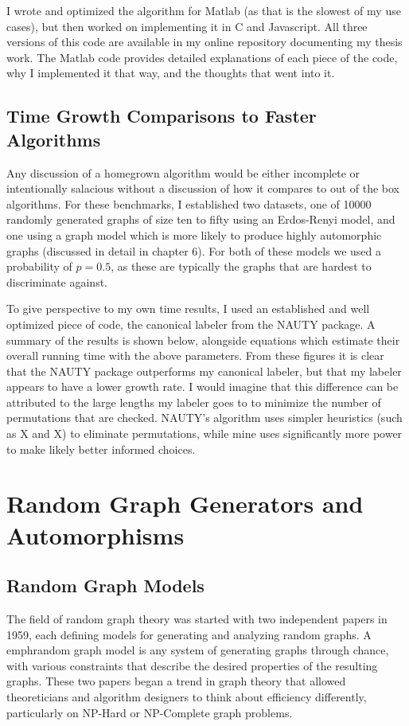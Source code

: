 \documentclass[11pt,a4paper]{report}
\begin{document}
I wrote and optimized the algorithm for Matlab (as that is the slowest of my use cases), but then worked on implementing it in C and Javascript.
All three versions of this code are available in my online repository documenting my thesis work.
The Matlab code provides detailed explanations of each piece of the code, why I implemented it that way, and the thoughts that went into it.

\section{Time Growth Comparisons to Faster Algorithms}
Any discussion of a homegrown algorithm would be either incomplete or intentionally salacious without a discussion of how it compares to out of the box algorithms.
For these benchmarks, I established two datasets, one of 10000 randomly generated graphs of size ten to fifty using an Erdos-Renyi model, and one using a graph model which is more likely to produce highly automorphic graphs (discussed in detail in chapter 6).
For both of these models we used a probability of $p=0.5$, as these are typically the graphs that are hardest to discriminate against.

To give perspective to my own time results, I used an established and well optimized piece of code, the canonical labeler from the NAUTY package.
A summary of the results is shown below, alongside equations which estimate their overall running time with the above parameters.
From these figures it is clear that the NAUTY package outperforms my canonical labeler, but that my labeler appears to have a lower growth rate.
I would imagine that this difference can be attributed to the large lengths my labeler goes to to minimize the number of permutations that are checked.
NAUTY's algorithm uses simpler heuristics (such as X and X) to eliminate permutations, while mine uses significantly more power to make likely better informed choices.



\chapter{Random Graph Generators and Automorphisms}

\section{Random Graph Models}


The field of random graph theory was started with two independent papers in 1959, each defining models for generating and analyzing random graphs.
A emph{random graph model} is any system of generating graphs through chance, with various constraints that describe the desired properties of the resulting graphs.
These two papers began a trend in graph theory that allowed theoreticians and algorithm designers to think about efficiency differently, particularly on NP-Hard or NP-Complete graph problems.
\end{document}
